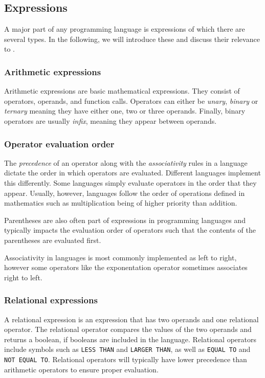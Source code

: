 \subsection{Expressions}
A major part of any programming language is expressions of which there are several types\cite{sebesta_concepts_2016}.
In the following, we will introduce these and discuss their relevance to \dazel{}.

\subsubsection*{Arithmetic expressions}
Arithmetic expressions are basic mathematical expressions.
They consist of operators, operands, and function calls. 
Operators can either be \textit{unary}, \textit{binary} or \textit{ternary} meaning they have either one, two or three operands.
Finally, binary operators are usually \textit{infix}, meaning they appear between operands\cite{sebesta_concepts_2016}.

\subsubsection*{Operator evaluation order}
The \textit{precedence} of an operator along with the \textit{associativity} rules in a language dictate the order in which operators are evaluated.
Different languages implement this differently. Some languages simply evaluate operators in the order that they appear. Usually, however, languages follow the order of operations defined in mathematics such as multiplication being of higher priority than addition\cite{sebesta_concepts_2016}.


Parentheses are also often part of expressions in programming languages and typically impacts the evaluation order of operators such that the contents of the parentheses are evaluated first\cite{sebesta_concepts_2016}.


Associativity in languages is most commonly implemented as left to right, however some operators like the exponentation operator sometimes associates right to left\cite{sebesta_concepts_2016}. 

\subsubsection*{Relational expressions}
A relational expression is an expression that has two operands and one relational operator. The relational operator compares the values of the two operands and returns a
boolean, if booleans are included in the language. Relational operators include symbols such as \texttt{LESS THAN} and \texttt{LARGER THAN}, as well as \texttt{EQUAL TO} and
\texttt{NOT EQUAL TO}. 
Relational operators will typically have lower precedence than arithmetic operators to ensure proper evaluation\cite{sebesta_concepts_2016}.


